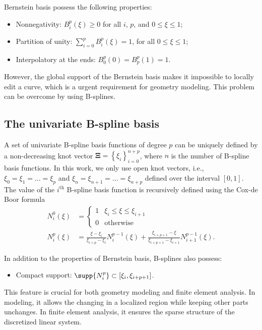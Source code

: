 Bernstein basis possess the following properties:
\begin{itemize}
    \item Nonnegativity: $B_i^p(\xi)\geq 0$ for all $i$, $p$, and $0\leq\xi\leq 1$;
    \item Partition of unity: $\sum_{i=0}^pB_i^p(\xi)=1$, for all $0\leq\xi\leq 1$;
    \item Interpolatory at the ends: $B_0^p(0)=B_p^p(1)=1$.
\end{itemize}

However, the global support of the Bernstein basis makes it impossible to locally edit a \Bezier curve, which is a urgent requirement for geometry modeling. This problem can be overcome by using B-splines.

\subsection{The univariate B-spline basis}

A set of univariate B-spline basis functions of degree $p$ can be uniquely defined by a non-decreasing knot vector $\mathbf{\Xi}=\left\{\xi_i\right\}_{i=0}^{n+p}$, where $n$ is the number of B-spline basis functions. In this work, we only use open knot vectors, i.e., $\xi_0=\xi_1=\dots=\xi_{p}$ and $\xi_{n}=\xi_{n+1}=\dots=\xi_{n+p}$ defined over the interval $\left[0,1\right]$. The value of the $i^{\text{th}}$ B-spline basis function is recursively defined using the Cox-de Boor formula~\cite{piegl2012nurbs}
\begin{align}
    N_{i}^0(\xi) & =\begin{cases}1 & \xi_i\leq{\xi}\leq{\xi_{i+1}}\\0 & \text{otherwise} \end{cases}                                                                                          \\
    N_{i}^p(\xi) & =\frac{\xi-\xi_i}{\xi_{i+p}-\xi_i}N_{i}^{p-1}(\xi)+\frac{\xi_{i+p+1}-\xi}{\xi_{i+p+1}-\xi_{i+1}}N_{i+1}^{p-1}(\xi).
\end{align}

In addition to the properties of Bernstein basis, B-splines also possess:
\begin{itemize}
    \item Compact support: $\supp{N_{i}^p}\subset \left[\xi_i,\xi_{i+p+1}\right]$.
\end{itemize}
This feature is crucial for both geometry modeling and finite element analysis. In modeling, it allows the changing in a localized region while keeping other parts unchanges. In finite element analysis, it ensures the sparse structure of the discretized linear system.

